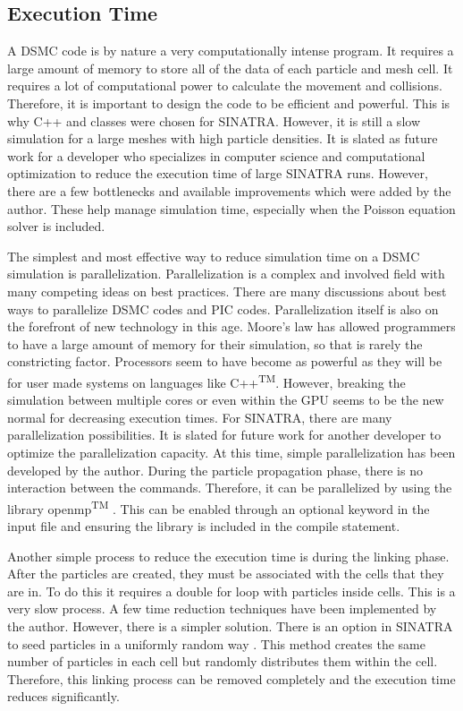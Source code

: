 \subsection{Execution Time} %
A DSMC code is by nature a very computationally intense program. It requires a large amount of memory to store all of the data of each particle and mesh cell. It requires a lot of computational power to calculate the movement and collisions. Therefore, it is important to design the code to be efficient and powerful. This is why C++ and classes were chosen for SINATRA. However, it is still a slow simulation for a large meshes with high particle densities. It is slated as future work for a developer who specializes in computer science and computational optimization to reduce the execution time of large SINATRA runs. However, there are a few bottlenecks and available improvements which were added by the author. These help manage simulation time, especially when the Poisson equation solver is included.\par
The simplest and most effective way to reduce simulation time on a DSMC simulation is parallelization. Parallelization is a complex and involved field with many competing ideas on best practices. There are many discussions about best ways to parallelize DSMC codes and PIC codes. Parallelization itself is also on the forefront of new technology in this age. Moore's law has allowed programmers to have a large amount of memory for their simulation, so that is rarely the constricting factor. Processors seem to have become as powerful as they will be for user made systems on languages like C++\textsuperscript{TM}. However, breaking the simulation between multiple cores or even within the GPU seems to be the new normal for decreasing execution times. For SINATRA, there are many parallelization possibilities. It is slated for future work for another developer to optimize the parallelization capacity. At this time, simple parallelization has been developed by the author. During the particle propagation phase, there is no interaction between the commands. Therefore, it can be parallelized by using the library openmp\textsuperscript{TM} \cite{openmp}. This can be enabled through an optional keyword in the input file and ensuring the library is included in the compile statement. \par
Another simple process to reduce the execution time is during the linking phase. After the particles are created, they must be associated with the cells that they are in. To do this it requires a double for loop with particles inside cells. This is a very slow process. A few time reduction techniques have been implemented by the author. However, there is a simpler solution. There is an option in SINATRA to seed particles in a uniformly random way \cite{Galvez2018a}. This method creates the same number of particles in each cell but randomly distributes them within the cell. Therefore, this linking process can be removed completely and the execution time reduces significantly. \par
